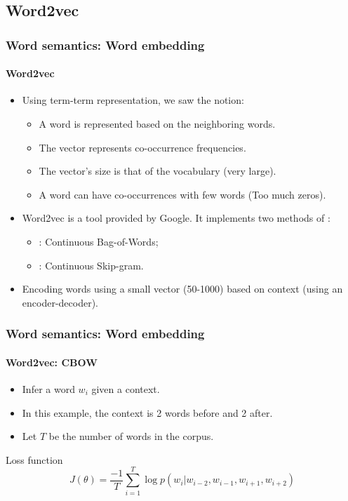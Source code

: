 \documentclass[xcolor=table]{beamer}
\begin{document}
\subsection{Word2vec}

\begin{frame}
\frametitle{Word semantics: Word embedding}
\framesubtitle{Word2vec}

\begin{itemize}
	\item Using term-term representation, we saw the  notion:
	\begin{itemize}
		\item A word is represented based on the neighboring words.
		\item The vector represents co-occurrence frequencies.
		\item The vector's size is that of the vocabulary (very large).
		\item A word can have co-occurrences with few words (Too much zeros).
	\end{itemize}
	\item Word2vec is a tool provided by Google. It implements two methods of  \cite{2013-mikolov-al}:
	\begin{itemize}
		\item {}: Continuous Bag-of-Words;
		\item {}: Continuous Skip-gram.
	\end{itemize}
	\item Encoding words using a small vector (50-1000) based on context (using an encoder-decoder).
\end{itemize}

\end{frame}

\begin{frame}
	\frametitle{Word semantics: Word embedding}
	\framesubtitle{Word2vec: CBOW}
\begin{minipage}{.63\textwidth}
	\begin{itemize}
		\item Infer a word $w_i$ given a context.
		\item In this example, the context is 2 words before and 2 after.
		\item Let $T$ be the number of words in the corpus.
	\end{itemize}
	\begin{block}{Loss function}
		\[%
		J(\theta) = \frac{-1}{T} \sum_{i=1}^{T} \log p(w_i |w_{i-2}, w_{i-1}, w_{i+1}, w_{i+2})
		\]
	\end{block}
\end{minipage}
\begin{minipage}{.36\textwidth}
\end{minipage}
	
\end{frame}
\end{document}
